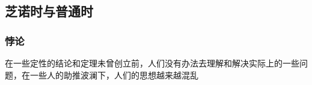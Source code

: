 \subsection{芝诺时与普通时}

\subsubsection{悖论}
在一些定性的结论和定理未曾创立前，人们没有办法去理解和解决实际上的一些问题，在一些人的助推波澜下，人们的思想越来越混乱
